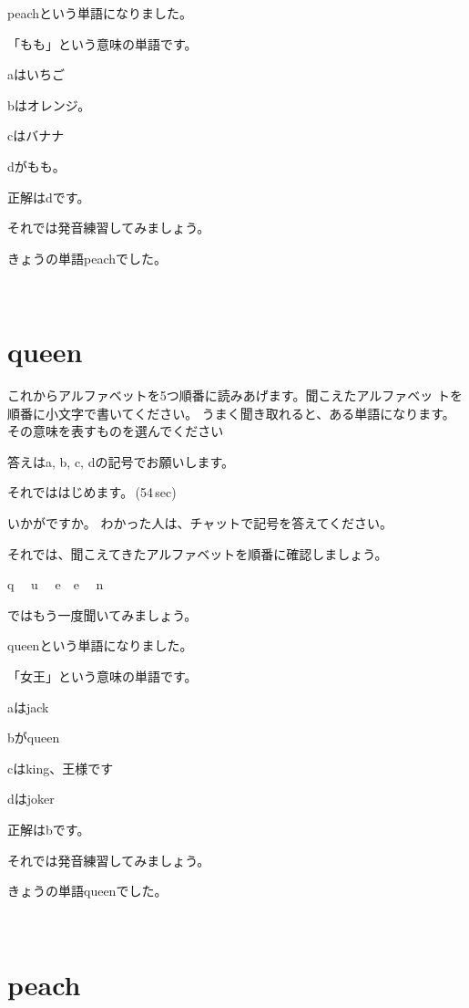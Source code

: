 \documentclass[12pt]{jlreq}
\begin{document}
peachという単語になりました。

「もも」という意味の単語です。

aはいちご

bはオレンジ。

cはバナナ

dがもも。


正解はdです。

それでは発音練習してみましょう。

きょうの単語peachでした。

{\large \ComputerMouse}\,\,

\newpage
\section{queen}

これからアルファベットを5つ順番に読みあげます。聞こえたアルファベッ
トを順番に小文字で書いてください。
うまく聞き取れると、ある単語になります。
その意味を表すものを選んでください

答えはa, b, c, dの記号でお願いします。

それでははじめます。\faVolumeUp\,(54\,sec)

いかがですか。
わかった人は、チャットで記号を答えてください。

それでは、聞こえてきたアルファベットを順番に確認しましょう。{\large \ComputerMouse}

q\,\,
{\large \ComputerMouse}\,\,
u\,\,
{\large \ComputerMouse}\,\,
e
{\large \ComputerMouse}\,\,
e\,\,
{\large \ComputerMouse}\,\,
n\,\,

ではもう一度聞いてみましょう。

queenという単語になりました。

「女王」という意味の単語です。

aはjack

bがqueen

cはking、王様です

dはjoker


正解はbです。

それでは発音練習してみましょう。

きょうの単語queenでした。

{\large \ComputerMouse}\,\,

\newpage
\section{peach}
\end{document}
